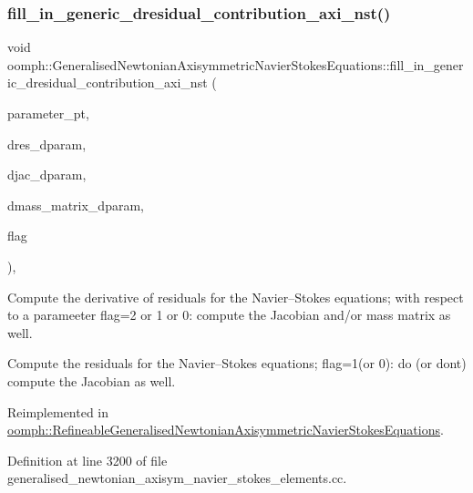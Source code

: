 \subsubsection{\texorpdfstring{fill\+\_\+in\+\_\+generic\+\_\+dresidual\+\_\+contribution\+\_\+axi\+\_\+nst()}{fill\_in\_generic\_dresidual\_contribution\_axi\_nst()}}
{\footnotesize\ttfamily void oomph\+::\+Generalised\+Newtonian\+Axisymmetric\+Navier\+Stokes\+Equations\+::fill\+\_\+in\+\_\+generic\+\_\+dresidual\+\_\+contribution\+\_\+axi\+\_\+nst (\begin{DoxyParamCaption}\item[{double $\ast$const \&}]{parameter\+\_\+pt,  }\item[{\hyperlink{classoomph_1_1Vector}{Vector}$<$ double $>$ \&}]{dres\+\_\+dparam,  }\item[{\hyperlink{classoomph_1_1DenseMatrix}{Dense\+Matrix}$<$ double $>$ \&}]{djac\+\_\+dparam,  }\item[{\hyperlink{classoomph_1_1DenseMatrix}{Dense\+Matrix}$<$ double $>$ \&}]{dmass\+\_\+matrix\+\_\+dparam,  }\item[{unsigned}]{flag }\end{DoxyParamCaption})\hspace{0.3cm}{\ttfamily [protected]}, {\ttfamily [virtual]}}



Compute the derivative of residuals for the Navier--Stokes equations; with respect to a parameeter flag=2 or 1 or 0\+: compute the Jacobian and/or mass matrix as well. 

Compute the residuals for the Navier--Stokes equations; flag=1(or 0)\+: do (or don\textquotesingle{}t) compute the Jacobian as well. 

Reimplemented in \hyperlink{classoomph_1_1RefineableGeneralisedNewtonianAxisymmetricNavierStokesEquations_a5c48a485d233b8932b58a46138d34241}{oomph\+::\+Refineable\+Generalised\+Newtonian\+Axisymmetric\+Navier\+Stokes\+Equations}.



Definition at line 3200 of file generalised\+\_\+newtonian\+\_\+axisym\+\_\+navier\+\_\+stokes\+\_\+elements.\+cc.



